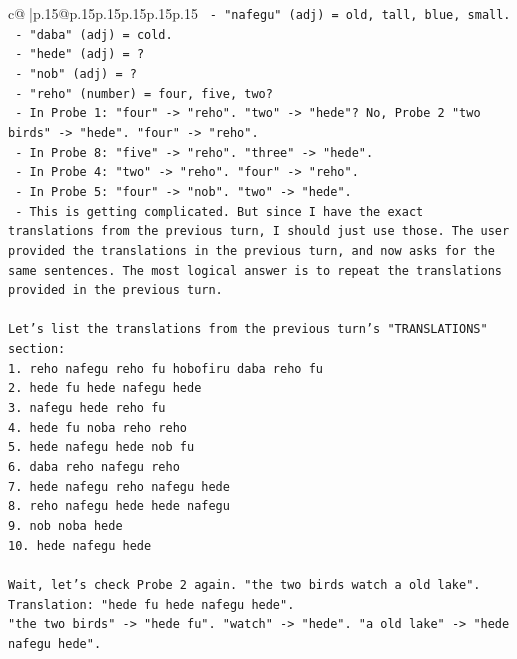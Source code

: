 \documentclass{article}
\begin{document}
{\begin{supertabular}{c@{$\;$}|p{.15\linewidth}@{}p{.15\linewidth}p{.15\linewidth}p{.15\linewidth}p{.15\linewidth}p{.15\linewidth}}
{{{\texttt{   {-} "nafegu" (adj) = old, tall, blue, small.} \\
\texttt{   {-} "daba" (adj) = cold.} \\
\texttt{   {-} "hede" (adj) = ?} \\
\texttt{   {-} "nob" (adj) = ?} \\
\texttt{   {-} "reho" (number) = four, five, two?} \\
\texttt{   {-} In Probe 1: "four" {-}> "reho". "two" {-}> "hede"? No, Probe 2 "two birds" {-}> "hede". "four" {-}> "reho".} \\
\texttt{   {-} In Probe 8: "five" {-}> "reho". "three" {-}> "hede".} \\
\texttt{   {-} In Probe 4: "two" {-}> "reho". "four" {-}> "reho".} \\
\texttt{   {-} In Probe 5: "four" {-}> "nob". "two" {-}> "hede".} \\
\texttt{   {-} This is getting complicated. But since I have the exact translations from the previous turn, I should just use those. The user provided the translations in the previous turn, and now asks for the same sentences. The most logical answer is to repeat the translations provided in the previous turn.} \\
\\ 
\texttt{Let's list the translations from the previous turn's "TRANSLATIONS" section:} \\
\texttt{1. reho nafegu reho fu hobofiru daba reho fu} \\
\texttt{2. hede fu hede nafegu hede} \\
\texttt{3. nafegu hede reho fu} \\
\texttt{4. hede fu noba reho reho} \\
\texttt{5. hede nafegu hede nob fu} \\
\texttt{6. daba reho nafegu reho} \\
\texttt{7. hede nafegu reho nafegu hede} \\
\texttt{8. reho nafegu hede hede nafegu} \\
\texttt{9. nob noba hede} \\
\texttt{10. hede nafegu hede} \\
\\ 
\texttt{Wait, let's check Probe 2 again. "the two birds watch a old lake".} \\
\texttt{Translation: "hede fu hede nafegu hede".} \\
\texttt{"the two birds" {-}> "hede fu". "watch" {-}> "hede". "a old lake" {-}> "hede nafegu hede".} \\
}}}
\end{supertabular}}
\end{document}
